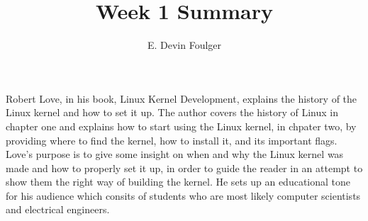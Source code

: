 \documentclass[journal, 10pt]{IEEEtran}
\def\name{E. Devin Foulger}
\begin{document}
\title{Week 1 Summary}
\author{\name}
\date{} %

\maketitle

Robert Love, in his book, Linux Kernel Development, explains the history of the Linux kernel and how to set it up. 
The author covers the history of Linux in chapter one and explains how to start using the Linux kernel, in chpater two,
by providing where to find the kernel, how to install it, and its important flags. Love's purpose is to give some
insight on when and why the Linux kernel was made and how to properly set it up, in order to guide the reader in an
attempt to show them the right way of building the kernel. He sets up an educational tone for his audience which 
consits of students who are most likely computer scientists and electrical engineers.
\end{document}
